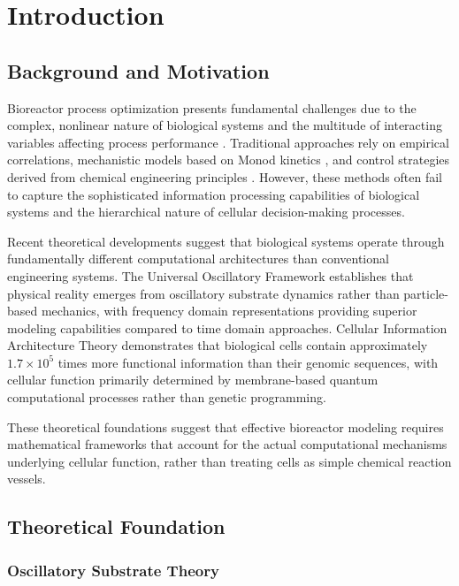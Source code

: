 \documentclass[12pt,a4paper]{article}
\begin{document}
\section{Introduction}

\subsection{Background and Motivation}

Bioreactor process optimization presents fundamental challenges due to the complex, nonlinear nature of biological systems and the multitude of interacting variables affecting process performance \cite{doran2012bioprocess}. Traditional approaches rely on empirical correlations, mechanistic models based on Monod kinetics \cite{monod1949growth}, and control strategies derived from chemical engineering principles \cite{shuler2017bioprocess}. However, these methods often fail to capture the sophisticated information processing capabilities of biological systems and the hierarchical nature of cellular decision-making processes.

Recent theoretical developments suggest that biological systems operate through fundamentally different computational architectures than conventional engineering systems. The Universal Oscillatory Framework establishes that physical reality emerges from oscillatory substrate dynamics rather than particle-based mechanics, with frequency domain representations providing superior modeling capabilities compared to time domain approaches. Cellular Information Architecture Theory demonstrates that biological cells contain approximately $1.7 \times 10^5$ times more functional information than their genomic sequences, with cellular function primarily determined by membrane-based quantum computational processes rather than genetic programming.

These theoretical foundations suggest that effective bioreactor modeling requires mathematical frameworks that account for the actual computational mechanisms underlying cellular function, rather than treating cells as simple chemical reaction vessels.

\subsection{Theoretical Foundation}

\subsubsection{Oscillatory Substrate Theory}
\end{document}
